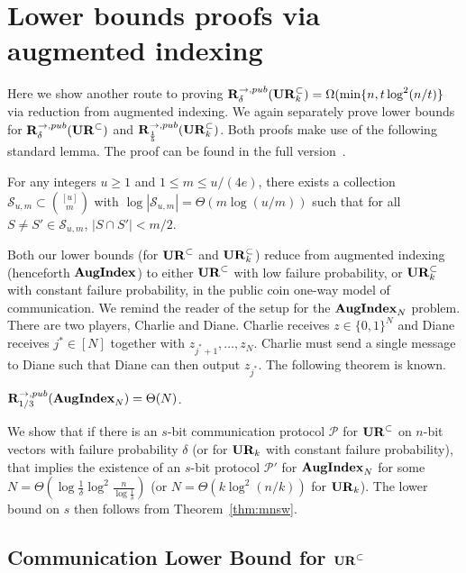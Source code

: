 \section{Lower bounds proofs via augmented indexing}\label{sec:aug-proof}

Here we show another route to proving $\mathbf{R}^{\rightarrow,pub}_\delta(\mathbf{UR}_k^\subset) = \Omega(\min\{n, t\log^2(n/t)\}$ via reduction from augmented indexing. We again separately prove lower bounds for $\mathbf{R}^{\rightarrow,pub}_\delta(\mathbf{UR}^\subset)$ and $\mathbf{R}^{\rightarrow,pub}_{\frac 15}(\mathbf{UR}_k^\subset)$. Both proofs make use of the following standard lemma. The proof can be found in the full version~\cite{KapralovNPWWY17}.

\begin{lemma}\label{lem:code}
For any integers $u\ge 1$ and $1\le m\le u/(4e)$, there exists a collection $\mathcal S_{u,m} \subset \binom{[u]}m$ with $\log |\mathcal{S}_{u,m}| = \Theta(m\log(u/m))$ such that for all $S\neq S'\in \mathcal S_{u,m}$, $|S\cap S'| < m/2$.
\end{lemma}

Both our lower bounds (for $\mathbf{UR}^\subset$ and $\mathbf{UR}_k^\subset$) reduce from augmented indexing (henceforth $\mathbf{AugIndex}$) to either $\mathbf{UR}^\subset$ with low failure probability, or $\mathbf{UR}_k^\subset$ with constant failure probability, in the public coin one-way model of communication. We remind the reader of the setup for the $\mathbf{AugIndex}_N$ problem. There are two players, Charlie and Diane. Charlie receives $z\in\{0,1\}^N$ and Diane receives $j^*\in[N]$ together with $z_{j^*+1},\ldots,z_N$. Charlie must send a single message to Diane such that Diane can then output $z_{j^*}$. The following theorem is known.

\begin{theorem}{\cite{MiltersenNSW98}}\label{thm:mnsw}
$\mathbf{R}^{\rightarrow,pub}_{1/3}(\mathbf{AugIndex}_N) = \Theta(N)$.
\end{theorem}

We show that if there is an $s$-bit communication protocol $\mathcal P$ for $\mathbf{UR}^\subset$ on $n$-bit vectors with failure probability $\delta$ (or for $\mathbf{UR}_k$ with constant failure probability), that implies the existence of an $s$-bit protocol $\mathcal P'$ for $\mathbf{AugIndex}_N$ for some $N=\Theta(\log\frac 1{\delta}\log^2\frac n{\log\frac 1{\delta}})$ (or $N=\Theta(k\log^2(n/k))$ for $\mathbf{UR}_k$). The lower bound on $s$ then follows from Theorem~\ref{thm:mnsw}.


\subsection{Communication Lower Bound for $\mathbf{UR}^\subset$}\label{sec:aug-delta}

